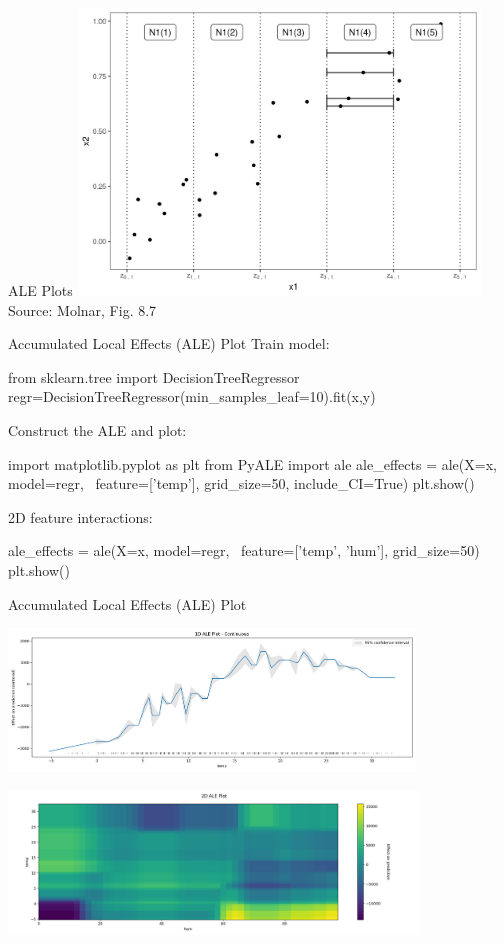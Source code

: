 \documentclass[ignorenonframetext,xcolor=x11names]{beamer}
\begin{document}
\begin{frame}{ALE Plots}
\centering
\includegraphics[height=3in]{molnar-8-7.jpeg} \\

\scriptsize Source: Molnar, Fig. 8.7
\end{frame}

\begin{frame}[fragile]{Accumulated Local Effects (ALE) Plot}
Train model:
\begin{pythoncode}
from sklearn.tree import DecisionTreeRegressor
regr=DecisionTreeRegressor(min_samples_leaf=10).fit(x,y)
\end{pythoncode}
Construct the ALE and plot:
\begin{pythoncode}
import matplotlib.pyplot as plt
from PyALE import ale
ale_effects = ale(X=x, model=regr, \
    feature=['temp'], grid_size=50, include_CI=True)
plt.show()
\end{pythoncode}
2D feature interactions:
\begin{pythoncode}
ale_effects = ale(X=x, model=regr, \
    feature=['temp', 'hum'], grid_size=50)
plt.show()
\end{pythoncode}
\end{frame}

\begin{frame}{Accumulated Local Effects (ALE) Plot}
\centering 

\includegraphics[height=1.5in]{ale_dtr.png} 

\includegraphics[height=1.5in]{2d_ale_dtr.png}

\end{frame}
\end{document}
